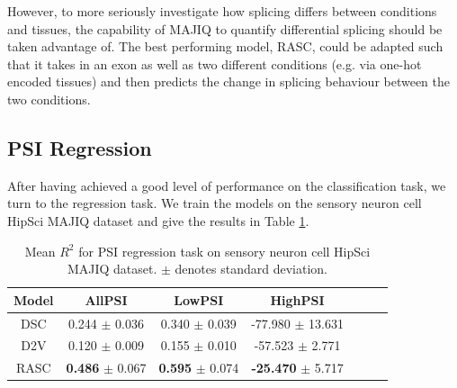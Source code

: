 



However, to more seriously investigate how splicing differs between conditions and tissues, the capability of MAJIQ to quantify differential splicing should be taken advantage of. The best performing model, RASC, could be adapted such that it takes in an exon as well as two different conditions (e.g. via one-hot encoded tissues) and then predicts the change in splicing behaviour between the two conditions. 


%

















\subsection{PSI Regression} \label{subsubsec:psi_regression}
After having achieved a good level of performance on the classification task, we turn to the regression task. We train the models on the sensory neuron cell HipSci MAJIQ dataset and give the results in Table \ref{table:psi_regression}. 


\begin{table}
	\centering
	\begin{tabular}{ c c c c c c c} 
		\hline
		Model & AllPSI &  LowPSI &  HighPSI \\
		\hline
		DSC	&	0.244   $\pm$	0.036	&	0.340	$\pm$	0.039	&	-77.980	$\pm$	13.631\\
		D2V	&	0.120	$\pm$	0.009	&	0.155	$\pm$	0.010	&	-57.523	$\pm$	2.771\\
		RASC	&	\textbf{0.486}	$\pm$	0.067	&	\textbf{0.595}	$\pm$	0.074	&	\textbf{-25.470}	$\pm$	5.717\\
		\hline
	\end{tabular}
	\caption{Mean $R^2$ for PSI regression task on sensory neuron cell HipSci MAJIQ dataset.  $\pm$ denotes standard deviation. 
	}
	\label{table:psi_regression}
\end{table}


